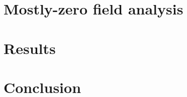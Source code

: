 \documentclass[preprint]{acmconf}
\begin{document}
\section{Mostly-zero field analysis}
\section{Results}
\section{Conclusion}




%
\end{document}
